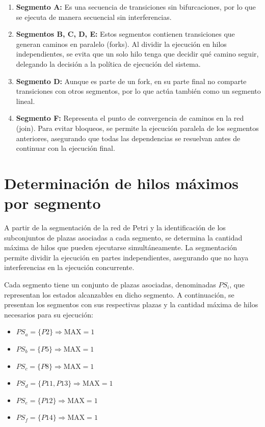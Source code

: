 \documentclass[12pt]{article}
\begin{document}
\begin{enumerate}
    \item \textbf{Segmento A:} Es una secuencia de transiciones sin bifurcaciones, por lo que se ejecuta de manera secuencial sin interferencias.
    
    \item \textbf{Segmentos B, C, D, E:} Estos segmentos contienen transiciones que generan caminos en paralelo (forks). Al dividir la ejecución en hilos independientes, se evita que un solo hilo tenga que decidir qué camino seguir, delegando la decisión a la política de ejecución del sistema.
    
    \item \textbf{Segmento D:} Aunque es parte de un fork, en su parte final no comparte transiciones con otros segmentos, por lo que actúa también como un segmento lineal.
    
    \item \textbf{Segmento F:} Representa el punto de convergencia de caminos en la red (join). Para evitar bloqueos, se permite la ejecución paralela de los segmentos anteriores, asegurando que todas las dependencias se resuelvan antes de continuar con la ejecución final.
\end{enumerate}

\section{Determinación de hilos máximos por segmento}

A partir de la segmentación de la red de Petri y la identificación de los subconjuntos de plazas asociadas a cada segmento, se determina la cantidad máxima de hilos que pueden ejecutarse simultáneamente. La segmentación permite dividir la ejecución en partes independientes, asegurando que no haya interferencias en la ejecución concurrente.

Cada segmento tiene un conjunto de plazas asociadas, denominadas \(PS_i\), que representan los estados alcanzables en dicho segmento. A continuación, se presentan los segmentos con sus respectivas plazas y la cantidad máxima de hilos necesarios para su ejecución:

\begin{itemize}
    \item \(PS_a = \{P2\} \Rightarrow \text{MAX} = 1\)
    \item \(PS_b = \{P5\} \Rightarrow \text{MAX} = 1\)
    \item \(PS_c = \{P8\} \Rightarrow \text{MAX} = 1\)
    \item \(PS_d = \{P11, P13\} \Rightarrow \text{MAX} = 1\)
    \item \(PS_e = \{P12\} \Rightarrow \text{MAX} = 1\)
    \item \(PS_f = \{P14\} \Rightarrow \text{MAX} = 1\)
\end{itemize}
\end{document}
